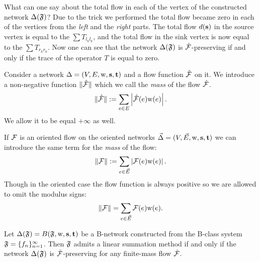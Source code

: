 \documentclass[12pt]{article}
\begin{document}
    What can one say about the total flow in each of the vertex of the constructed network $\Delta(\mathfrak{F})$?
    Due to the trick we performed the total flow became zero in each of the vertices from the \emph{left} and the \emph{right} parts.
    The total flow $d(\mathbf{s})$ in the source vertex is equal to the $\sum T_{l_k l_k}$, and the total flow in the
      sink vertex is now equal to the $\sum T_{r_k r_k}$.
    Now one can see that the network $\Delta(\mathfrak{F})$ is $\mathcal{\hat{F}}$-preserving if and only if the trace of the operator $T$ is equal to
      zero.
    \begin{definition}
      Consider a network $\Delta = (V, E, \mathrm{w}, \mathbf{s}, \mathbf{t})$ and a flow function $\mathcal{\hat{F}}$ on it.
      We introduce a non-negative function $\|\mathcal{\hat{F}}\|$ which we call the \emph{mass} of the flow $\mathcal{\hat{F}}$.
      \[
        \|\mathcal{\hat{F}}\| := \sum_{e \in E} \left|\mathcal{\hat{F}}(e) \mathrm{w}(e)\right|.
      \]
      We allow it to be equal $+\infty$ as well.
    \end{definition}
    \begin{definition}
      If $\mathcal{F}$ is an oriented flow on the oriented networks $\vec{\Delta} = (V,\vec{E},\mathrm{w}, \mathbf{s}, \mathbf{t})$ 
        we can introduce the same term for the \emph{mass} of the flow:
      \[
        \|\mathcal{F}\| := \sum_{e \in \vec{E}} \left|\mathcal{F}(e) \mathrm{w}(e)\right|.
      \]
      Though in the oriented case the flow function is always positive
        so we are allowed to omit the modulus signs:
      \[
        \|\mathcal{F}\| = \sum_{e \in \vec{E}} \mathcal{F}(e) \mathrm{w}(e).
      \]
    \end{definition}
    \begin{theorem}
      \label{thm-graph-eq}
        Let $\Delta(\mathfrak{F}) = B(\mathfrak{F}, \mathrm{w}, \mathbf{s}, \mathbf{t})$ be a B-network constructed
          from the B-class system $\mathfrak{F} = \{{f}_n\}_{n=1}^\infty$.
        Then $\mathfrak{F}$ admits a linear summation method if and only if
          the network $\Delta(\mathfrak{F})$ is $\mathcal{\hat{F}}$-preserving for any
          finite-mass flow $\mathcal{\hat{F}}$.
    \end{theorem}
\end{document}
